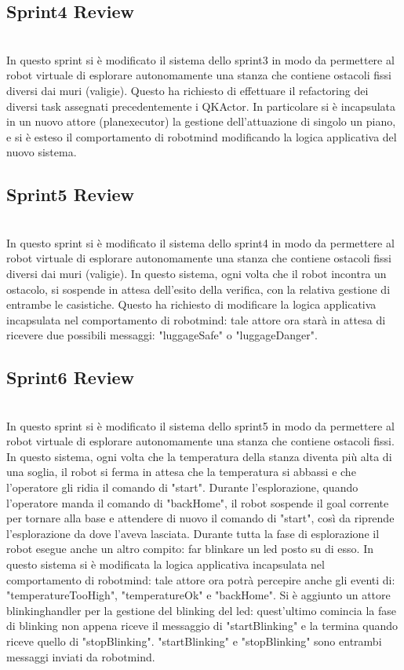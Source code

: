 \subsection*{Sprint4 Review }
\date{29/08/2019}\\
In questo sprint si è modificato il sistema dello sprint3 in modo da permettere al robot virtuale di esplorare autonomamente una stanza che contiene ostacoli fissi diversi dai muri (valigie). Questo ha richiesto di effettuare il refactoring dei diversi task assegnati precedentemente i QKActor. In particolare si è incapsulata in un nuovo attore (planexecutor) la gestione dell'attuazione di singolo un piano, e si è esteso il comportamento di robotmind modificando la logica applicativa del nuovo sistema. 

\subsection*{Sprint5 Review }
\date{4/09/2019}\\
In questo sprint si è modificato il sistema dello sprint4 in modo da permettere al robot virtuale di esplorare autonomamente una stanza che contiene ostacoli fissi diversi dai muri (valigie). In questo sistema, ogni volta che il robot incontra un ostacolo, si sospende in attesa dell'esito della verifica, con la relativa gestione di entrambe le casistiche.  Questo ha richiesto di modificare la logica applicativa incapsulata nel comportamento di robotmind: tale attore ora starà in attesa di ricevere due possibili messaggi: "luggageSafe" o "luggageDanger".

\subsection*{Sprint6 Review}
\date{12/09/2019}\\
In questo sprint si è modificato il sistema dello sprint5 in modo da permettere al robot virtuale di esplorare autonomamente una stanza che contiene ostacoli fissi. In questo sistema, ogni volta che la temperatura della stanza diventa più alta di una soglia, il robot si ferma in attesa che la temperatura si abbassi e che l'operatore gli ridia il comando di "start".
Durante l'esplorazione, quando l'operatore manda il comando di "backHome", il robot sospende il goal corrente per tornare alla base e attendere di nuovo il comando di "start", così da riprende l'esplorazione da dove l'aveva lasciata.
Durante tutta la fase di esplorazione il robot esegue anche un altro compito: far blinkare un led posto su di esso.
In questo sistema si è modificata la logica applicativa incapsulata nel comportamento di robotmind: tale attore ora potrà percepire anche gli eventi di: "temperatureTooHigh", "temperatureOk" e "backHome". 
Si è aggiunto un attore blinkinghandler per la gestione del blinking del led: quest'ultimo comincia la fase di blinking non appena riceve il messaggio di "startBlinking" e la termina quando riceve quello di "stopBlinking". "startBlinking" e "stopBlinking" sono entrambi messaggi inviati da robotmind.